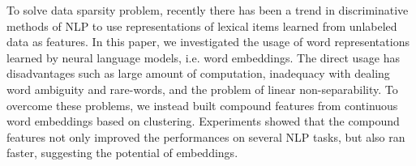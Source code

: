 To solve data sparsity problem, recently there has been a trend in discriminative methods of NLP to use representations of lexical items learned
 from unlabeled data as features. In this paper, we investigated the usage of
 word representations learned by neural language models, i.e. word embeddings.
 The direct usage has disadvantages such as large amount of computation,
 inadequacy with dealing word ambiguity and rare-words, and the problem of
 linear non-separability. To overcome these problems, we instead built compound
 features from continuous word embeddings based on clustering. Experiments
 showed that the compound features not only improved the performances on several
 NLP tasks, but also ran faster, suggesting the potential of embeddings.

